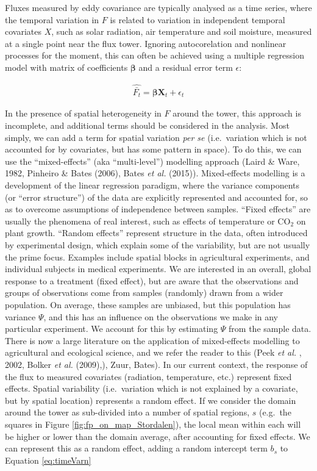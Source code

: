 Fluxes measured by eddy covariance are typically analysed as a time
series, where the temporal variation in \(F\) is related to variation in
independent temporal covariates \(X\), such as solar radiation, air
temperature and soil moisture, measured at a single point near the flux
tower. Ignoring autocorelation and nonlinear processes for the moment,
this can often be achieved using a multiple regression model with matrix
of coefficients \(\boldsymbol{\beta}\) and a residual error term
\(\epsilon\):

\begin{align}
   \label{eq:timeVarn} 
  \widehat{\bar{F_t}} = \boldsymbol{\beta} \mathbf{X}_t + \epsilon_{t}

\end{align}

In the presence of spatial heterogeneity in \(F\) around the tower, this
approach is incomplete, and additional terms should be considered in the
analysis. Most simply, we can add a term for spatial variation \emph{per
se} (i.e.~variation which is not accounted for by covariates, but has
some pattern in space). To do this, we can use the ``mixed-effects''
(aka ``multi-level'') modelling approach (Laird \& Ware, 1982, Pinheiro
\& Bates (2006), Bates \emph{et al.} (2015)). Mixed-effects modelling is
a development of the linear regression paradigm, where the variance
components (or ``error structure'') of the data are explicitly
represented and accounted for, so as to overcome assumptions of
independence between samples. ``Fixed effects'' are usually the
phenomena of real interest, such as effects of temperature or CO\(_2\)
on plant growth. ``Random effects'' represent structure in the data,
often introduced by experimental design, which explain some of the
variability, but are not usually the prime focus. Examples include
spatial blocks in agricultural experiments, and individual subjects in
medical experiments. We are interested in an overall, global response to
a treatment (fixed effect), but are aware that the observations and
groups of observations come from samples (randomly) drawn from a wider
population. On average, these samples are unbiased, but this population
has variance \(\Psi\), and this has an influence on the observations we
make in any particular experiment. We account for this by estimating
\(\Psi\) from the sample data. There is now a large literature on the
application of mixed-effects modelling to agricultural and ecological
science, and we refer the reader to this (Peek \emph{et al.} , 2002,
Bolker \emph{et al.} (2009),), Zuur, Bates). In our current context, the
response of the flux to measured covariates (radiation, temperature,
etc.) represent fixed effects. Spatial variability (i.e.~variation which
is not explained by a covariate, but by spatial location) represents a
random effect. If we consider the domain around the tower as sub-divided
into a number of spatial regions, \(s\) (e.g.~the squares in Figure
\ref{fig:fp_on_map_Stordalen}), the local mean within each will be
higher or lower than the domain average, after accounting for fixed
effects. We can represent this as a random effect, adding a random
intercept term \(b_s\) to Equation \ref{eq:timeVarn}

